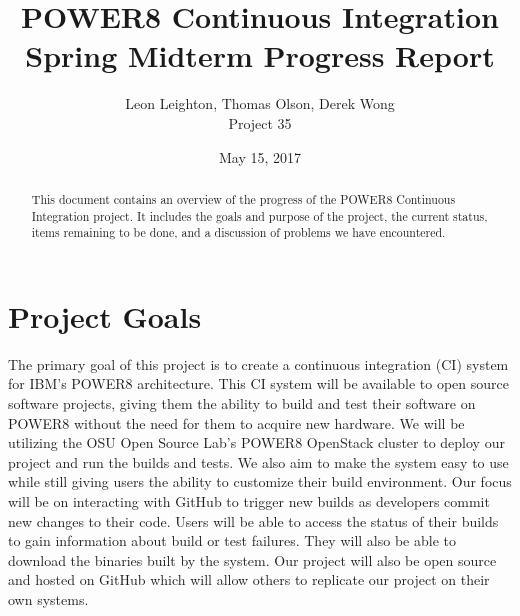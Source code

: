 \documentclass[10pt,onecolumn,journal,draftclsnofoot]{IEEEtran}
\begin{document}
\begin{titlepage}
  \title{POWER8 Continuous Integration\\ Spring Midterm Progress Report}
  \author{Leon Leighton, Thomas Olson, Derek Wong\\Project 35}
  \date{May 15, 2017}
  \maketitle
  \vspace{4cm}
  \begin{abstract}
  \noindent This document contains an overview of the progress of the POWER8 Continuous Integration project.
    It includes the goals and purpose of the project, the current status, items remaining to be done, 
    and a discussion of problems we have encountered. 
 \end{abstract}
\end{titlepage}

\tableofcontents
\clearpage

\section{Project Goals}
The primary goal of this project is to create a continuous integration (CI) system for IBM's POWER8 architecture.
This CI system will be available to open source software projects, giving them the ability to build and test their software on POWER8 without the need for them to acquire new hardware.
We will be utilizing the OSU Open Source Lab's POWER8 OpenStack cluster to deploy our project and run the builds and tests.
We also aim to make the system easy to use while still giving users the ability to customize their build environment.
Our focus will be on interacting with GitHub to trigger new builds as developers commit new changes to their code.
Users will be able to access the status of their builds to gain information about build or test failures.
They will also be able to download the binaries built by the system.
Our project will also be open source and hosted on GitHub which will allow others to replicate our project on their own systems.
\end{document}
